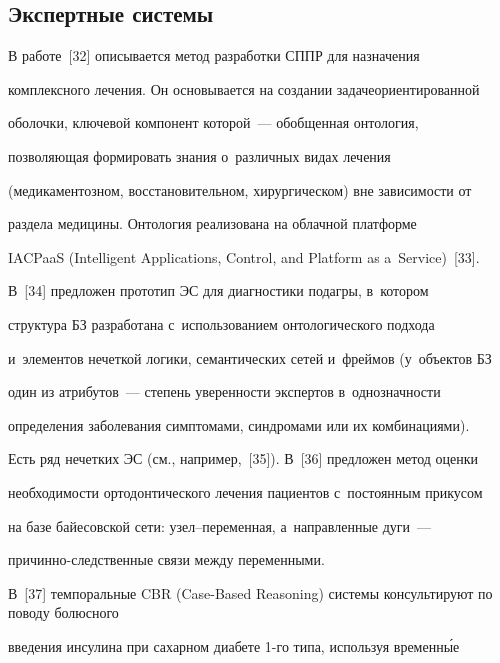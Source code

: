 
  

  \subsection{Экспертные системы}

  


  

  В работе~[32] описывается метод разработки СППР для назначения 

комплексного лечения. Он основывается на создании задачеориентированной 

оболочки, ключевой компонент которой~--- обобщенная онтология, 

позволяющая формировать знания о~различных видах лечения 

(медикаментозном, восстановительном, хирургическом) вне зависимости от 

раздела медицины. Онтология реализована на облачной платформе 

IACPaaS (Intelligent Applications, Control, and Platform as a~Service)~[33]. 

  

  В~[34] предложен прототип ЭС для диагностики подагры, в~котором 

структура БЗ разработана с~использованием онтологического подхода 

и~элементов нечеткой логики, семантических сетей и~фреймов (у~объектов БЗ 

один из атрибутов~--- степень уверенности экспертов в~однозначности 

определения заболевания симптомами, синдромами или их комбинациями). 

  

  Есть ряд нечетких ЭС (см., например,~[35]). В~[36] предложен метод оценки 

необходимости ортодонтического лечения пациентов с~постоянным прикусом 

на базе байесовской сети: узел--пе\-ре\-мен\-ная, а~направленные дуги~---  

при\-чин\-но-след\-ст\-вен\-ные связи между переменными. 

  

  В~[37] темпоральные CBR (Case-Based Reasoning) сис\-те\-мы консультируют по поводу болюсного 

введения инсулина при сахарном диабете 1-го типа, используя временн\'{ы}е 

